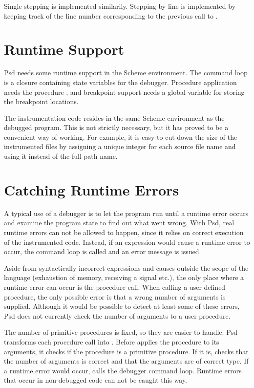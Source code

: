 Single stepping is implemented similarily. Stepping by line is
implemented by keeping track of the line number corresponding to the
previous call to .


\section{Runtime Support}

Psd needs some runtime support in the Scheme environment. The command
loop  is a closure containing state variables for
the debugger. Procedure application needs the procedure
, and breakpoint support needs a global variable for
storing the breakpoint locations. 

The instrumentation code resides in the same Scheme environment as the
debugged program. This is not strictly necessary, but it has proved to
be a convenient way of working. For example, it is easy to cut down the size of
the instrumented files by assigning a
unique integer for each source file name and using it instead of the
full path name. 

\section{Catching Runtime Errors}

A typical use of a debugger is to let the program run until a runtime
error occurs and examine the program state to find out what went
wrong. With Psd, real runtime errors can not be allowed to happen,
since it relies on correct execution of the instrumented code.
Instead, if an expression would cause a runtime error to occur, the
command loop is called and an error message is issued.

Aside from syntactically incorrect expressions and causes outside the
scope of the language (exhaustion of memory, receiving a signal etc.),
the only place where a runtime error can occur is the procedure call.
When calling a user defined procedure, the only possible error is that
a wrong number of arguments is supplied. Although it would be possible
to detect at least some of these errors, Psd does not currently check
the number of arguments to a user procedure.

The number of primitive procedures is fixed, so they are easier to
handle. Psd transforms each procedure call  into
. Before  applies the
procedure to its arguments, it checks if the procedure is a primitive
procedure. If it is,  checks that the number of
arguments is correct and that the arguments are of correct type. If a
runtime error would occur,  calls the debugger
command loop. Runtime errors that occur in non-debugged code can not
be caught this way.

